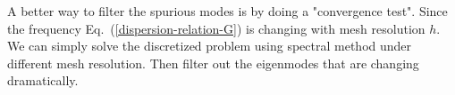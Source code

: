A better way to filter the spurious modes is by doing a "convergence test". Since the frequency Eq.~(\ref{dispersion-relation-G}) is changing with mesh resolution $h$. We can simply solve the discretized problem using spectral method under different mesh resolution. Then filter out the eigenmodes that are changing dramatically.
